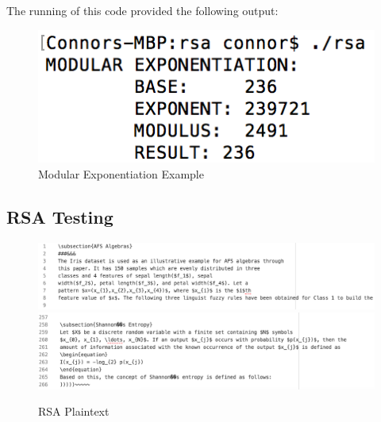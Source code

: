 \documentclass[]{article}
\begin{document}
The running of this code provided the following output:

\begin{figure}[H]
		\centering
	\includegraphics[height=\textheight/10,width=\textwidth/3]{exponentiation.png}
	\caption{Modular Exponentiation Example}
\end{figure}

\pagebreak

\vspace*{-0.8cm}

\subsection*{RSA Testing}

\begin{figure}[H]
	\includegraphics[height=\textheight/6,width=\textwidth]{rsa_plain1.png}
	\includegraphics[height=\textheight/6,width=\textwidth]{rsa_plain2.png}	
	\caption{RSA Plaintext}
	\centering
\end{figure}
\end{document}
